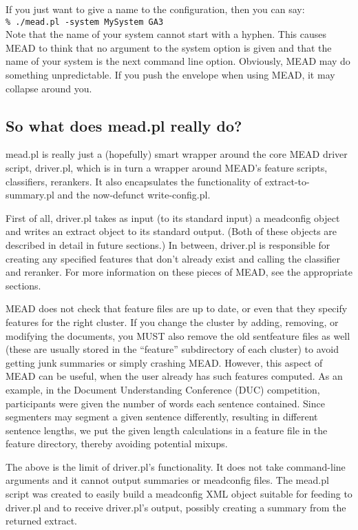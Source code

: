 \documentclass[10pt]{article}
\begin{document}
If you just want to give a name to the configuration, then you can say:\\

        \verb|% ./mead.pl -system MySystem GA3|\\

Note that the name of your system cannot start with a hyphen.  This causes
MEAD to think that no argument to the system option is given and that the
name of your system is the next command line option.  Obviously, MEAD
may do something unpredictable.  
If you push the envelope when using MEAD, it may
collapse around you.

\subsection{So what does mead.pl really do?}

mead.pl is really just a (hopefully) smart wrapper around the core
MEAD driver script, driver.pl, which is in turn a wrapper around
MEAD's feature scripts, classifiers, rerankers.  It also
encapsulates the functionality of extract-to-summary.pl and the
now-defunct write-config.pl.

First of all, driver.pl takes as input (to its standard input) a
meadconfig object and writes an extract object to its standard output.  
(Both of these objects are described in detail in future sections.)
In between, driver.pl is responsible for 
creating any specified features that don't
already exist and calling the classifier and reranker.  For more 
information on these pieces of MEAD, see the appropriate sections.

MEAD does not
check that feature files are up to date, or even that they specify 
features for the right cluster.  If you change the cluster by adding,
removing, or modifying the documents, you MUST also remove the old 
sentfeature files as well (these are usually stored in the ``feature''
subdirectory of each cluster) to avoid getting junk summaries or
simply crashing MEAD.  However, this aspect of MEAD can be useful,
when the user already has such features computed.  As an example, 
in the Document Understanding Conference (DUC) competition, participants
were given the number of words each sentence contained.  Since segmenters 
may segment a given sentence differently, resulting in different
sentence lengths, we put the given length calculations in a feature
file in the feature directory, thereby avoiding potential mixups.

The above is the limit of driver.pl's functionality.  
It does not take command-line arguments
and it cannot output summaries or meadconfig files.
The mead.pl script was created to easily build a meadconfig XML
object suitable for feeding to driver.pl and to receive driver.pl's
output, possibly creating a summary from the returned extract.
\end{document}
